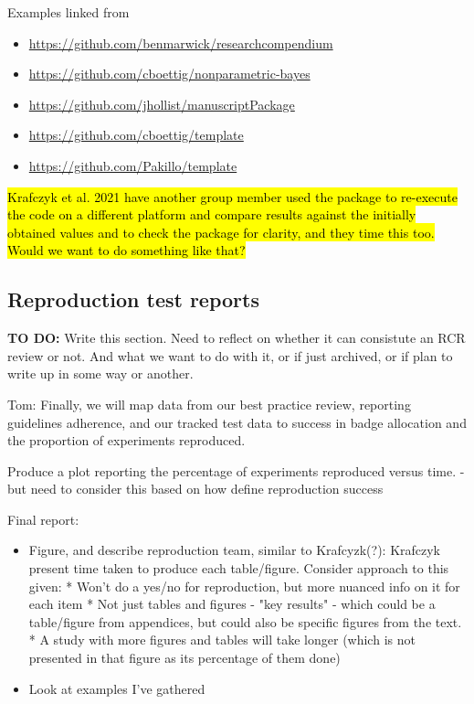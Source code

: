 Examples linked from \autocite{marwick_packaging_2018}
\begin{itemize}
    \item \url{https://github.com/benmarwick/researchcompendium}
    \item \url{https://github.com/cboettig/nonparametric-bayes}
    \item \url{https://github.com/jhollist/manuscriptPackage}
    \item \url{https://github.com/cboettig/template}
    \item \url{https://github.com/Pakillo/template}
\end{itemize}

\hl{Krafczyk et al. 2021 have another group member used the package to re-execute the code on a different platform and compare results against the initially obtained values and to check the package for clarity, and they time this too. Would we want to do something like that?}

\subsection{Reproduction test reports} \label{sec:report}
\logno


\textbf{TO DO:} Write this section. Need to reflect on whether it can consistute an RCR review or not. And what we want to do with it, or if just archived, or if plan to write up in some way or another.

Tom: Finally, we will map data from our best practice review, reporting guidelines adherence, and our tracked test data to success in badge allocation and the proportion of experiments reproduced.

Produce a plot reporting the percentage of experiments reproduced versus time. - but need to consider this based on how define reproduction success

Final report:
\begin{itemize}
    \item Figure, and describe reproduction team, similar to Krafcyzk(?):\autocite{krafczyk_learning_2021} Krafczyk present time taken to produce each table/figure. Consider approach to this given: * Won't do a yes/no for reproduction, but more nuanced info on it for each item * Not just tables and figures - "key results" - which could be a table/figure from appendices, but could also be specific figures from the text. * A study with more figures and tables will take longer (which is not presented in that figure as its percentage of them done)
    \item Look at examples I've gathered
\end{itemize}

